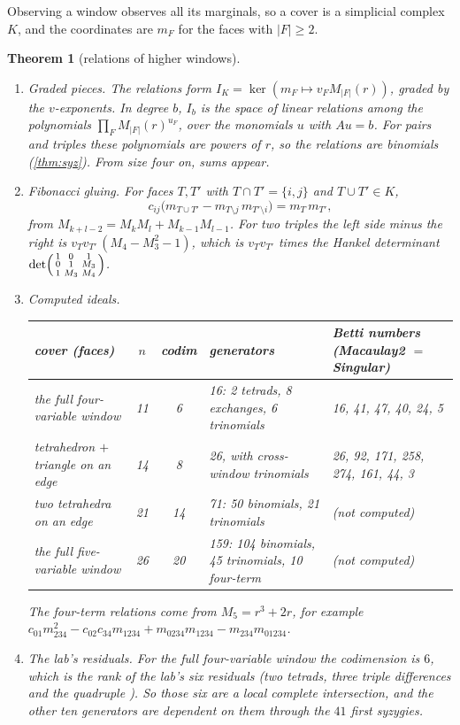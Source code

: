\documentclass[11pt]{article}
\newtheorem{theorem}{Theorem}\newtheorem{proposition}[theorem]{Proposition}\newtheorem{lemma}[theorem]{Lemma}\newtheorem{corollary}[theorem]{Corollary}
\theoremstyle{definition}\newtheorem{definition}[theorem]{Definition}\newtheorem{remark}[theorem]{Remark}\newtheorem{example}[theorem]{Example}
\begin{document}
Observing a window observes all its marginals, so a cover is a simplicial complex $K$, and the coordinates are $m_F$ for the faces with
$|F|\ge2$.

\begin{theorem}[relations of higher windows]\label{thm:higher}
\begin{enumerate}
\item[(1)] \emph{Graded pieces.} The relations form $I_K=\ker(m_F\mapsto v_FM_{|F|}(r))$, graded by the $v$-exponents. In degree $b$,
  $I_b$ is the space of linear relations among the polynomials $\prod_FM_{|F|}(r)^{u_F}$, over the monomials $u$ with $Au=b$. For pairs
  and triples these polynomials are powers of $r$, so the relations are binomials (\cref{thm:syz}). From size four on, sums appear.
\item[(2)] \emph{Fibonacci gluing.} For faces $T,T'$ with $T\cap T'=\{i,j\}$ and $T\cup T'\in K$,
\[
c_{ij}\bigl(m_{T\cup T'}-m_{T\setminus j}\,m_{T'\setminus i}\bigr)=m_T\,m_{T'} ,
\]
  from $M_{k+l-2}=M_kM_l+M_{k-1}M_{l-1}$. For two triples the left side minus the right is
  $v_Tv_{T'}\,(M_4-M_3^2-1)$, which is $v_Tv_{T'}$ times the Hankel determinant
  $\det\begin{psmallmatrix}1&0&1\\0&1&M_3\\1&M_3&M_4\end{psmallmatrix}$.
\item[(3)] \emph{Computed ideals.}
\begin{center}\small
\begin{tabular}{p{}ccp{}p{}}\toprule
cover (faces) & $n$ & codim & generators & Betti numbers (Macaulay2 $=$ Singular)\\\midrule
the full four-variable window & 11 & 6 & 16: 2 tetrads, 8 exchanges, 6 trinomials & 16, 41, 47, 40, 24, 5\\
tetrahedron $+$ triangle on an edge & 14 & 8 & 26, with cross-window trinomials & 26, 92, 171, 258, 274, 161, 44, 3\\
two tetrahedra on an edge & 21 & 14 & 71: 50 binomials, 21 trinomials & (not computed)\\
the full five-variable window & 26 & 20 & 159: 104 binomials, 45 trinomials, 10 four-term & (not computed)\\\bottomrule
\end{tabular}
\end{center}
  The four-term relations come from $M_5=r^3+2r$, for example
  $c_{01}m_{234}^2-c_{02}c_{34}m_{1234}+m_{0234}m_{1234}-m_{234}m_{01234}$.
\item[(4)] \emph{The lab's residuals.} For the full four-variable window the codimension is $6$, which is the rank of the lab's six
  residuals (two tetrads, three triple differences and the quadruple \cite[Theorem G]{Lab}). So those six are a local complete
  intersection, and the other ten generators are dependent on them through the $41$ first syzygies.
\end{enumerate}
\end{theorem}
\end{document}
